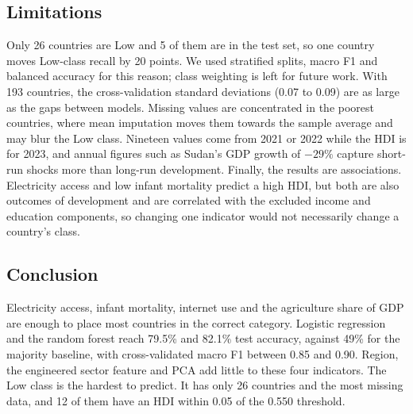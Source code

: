\documentclass[10pt,a4paper]{article}
\begin{document}
\subsection{Limitations}
Only 26 countries are Low and 5 of them are in the test set, so one country moves Low-class recall by 20 points. We
used stratified splits, macro F1 and balanced accuracy for this reason; class weighting is left for future work.
With 193 countries, the cross-validation standard deviations (0.07 to 0.09) are as large as the gaps between
models. Missing values are concentrated in the poorest countries, where mean imputation moves them towards the
sample average and may blur the Low class. Nineteen values come from 2021 or 2022 while the HDI is for 2023, and
annual figures such as Sudan's GDP growth of $-29\%$ capture short-run shocks more than long-run development.
Finally, the results are associations. Electricity access and low infant mortality predict a high HDI, but both
are also outcomes of development and are correlated with the excluded income and education components, so
changing one indicator would not necessarily change a country's class.

\subsection{Conclusion}
Electricity access, infant mortality, internet use and the agriculture share of GDP are enough to place most
countries in the correct category. Logistic regression and the random forest reach 79.5\% and 82.1\% test accuracy,
against 49\% for the majority baseline, with cross-validated macro F1 between 0.85 and 0.90. Region, the engineered
sector feature and PCA add little to these four indicators. The Low class is the hardest to predict. It has only 26
countries and the most missing data, and 12 of them have an HDI within 0.05 of the 0.550 threshold.
\end{document}

